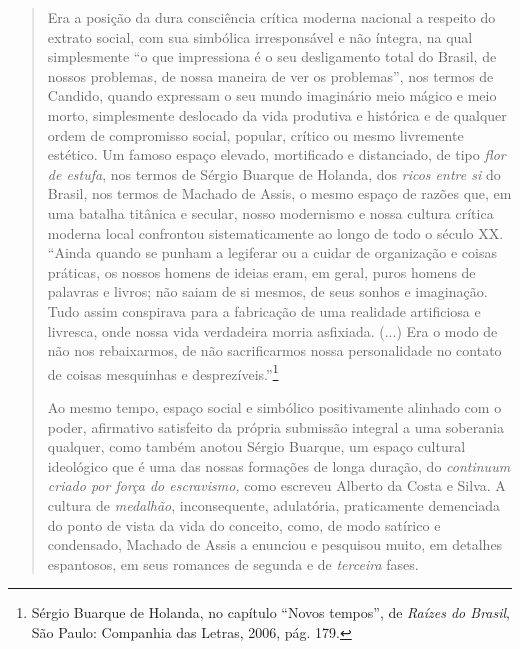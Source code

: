\begin{quote}
Era a posição da dura consciência crítica moderna nacional a respeito do
extrato social, com sua simbólica irresponsável e não íntegra, na qual
simplesmente ``o que impressiona é o seu desligamento total do Brasil,
de nossos problemas, de nossa maneira de ver os problemas'', nos termos
de Candido, quando expressam o seu mundo imaginário meio mágico e meio
morto, simplesmente deslocado da vida produtiva e histórica e de
qualquer ordem de compromisso social, popular, crítico ou mesmo
livremente estético. Um famoso espaço elevado, mortificado e
distanciado, de tipo \emph{flor de estufa}, nos termos de Sérgio Buarque
de Holanda, dos \emph{ricos entre si} do Brasil, nos termos de Machado
de Assis, o mesmo espaço de razões que, em uma batalha titânica e
secular, nosso modernismo e nossa cultura crítica moderna local
confrontou sistematicamente ao longo de todo o século XX. ``Ainda quando
se punham a legiferar ou a cuidar de organização e coisas práticas, os
nossos homens de ideias eram, em geral, puros homens de palavras e
livros; não saiam de si mesmos, de seus sonhos e imaginação. Tudo assim
conspirava para a fabricação de uma realidade artificiosa e livresca,
onde nossa vida verdadeira morria asfixiada. (...) Era o modo de não nos
rebaixarmos, de não sacrificarmos nossa personalidade no contato de
coisas mesquinhas e desprezíveis.''\footnote{Sérgio Buarque de Holanda,
  no capítulo ``Novos tempos'', de \emph{Raízes do Brasil}, São Paulo:
  Companhia das Letras, 2006, pág. 179.}

Ao mesmo tempo, espaço social e simbólico positivamente alinhado com o
poder, afirmativo satisfeito da própria submissão integral a uma
soberania qualquer, como também anotou Sérgio Buarque, um espaço
cultural ideológico que é uma das nossas formações de longa duração, do
\emph{continuum criado por força do escravismo,} como escreveu Alberto
da Costa e Silva. A cultura de \emph{medalhão}, inconsequente,
adulatória, praticamente demenciada do ponto de vista da vida do
conceito, como, de modo satírico e condensado, Machado de Assis a
enunciou e pesquisou muito, em detalhes espantosos, em seus romances de
segunda e de \emph{terceira} fases.


\end{quote}
